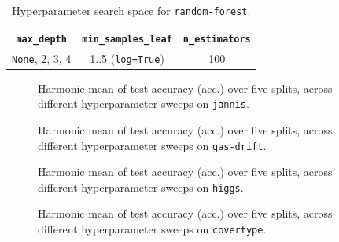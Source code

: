 \documentclass{article}
\begin{document}
\begin{table}[htbp]
  \centering
  \caption{Hyperparameter search space for \texttt{random-forest}.}
  \label{tab:hyperparams_spaces_random_forest}
  \small
  \begin{tabular}{ccc}
    \toprule
    \texttt{max\_depth} & \small\texttt{min\_samples\_leaf} & \texttt{n\_estimators} \\
    \midrule
    \texttt{None}, 2, 3, 4 & 1..5 (\texttt{log=True}) & 100 \\
    \bottomrule
  \end{tabular}
\end{table}

\begin{figure}[htbp]
  \centering
  
  
  
  \caption{
    Harmonic mean of test accuracy (acc.) over five splits, across different
    hyperparameter sweeps on \texttt{jannis}.
  }
  \label{fig:sweep_pareto_jannis}
\end{figure}

\begin{figure}[htbp]
  \centering
  
  
  
  \caption{
    Harmonic mean of test accuracy (acc.) over five splits, across different
    hyperparameter sweeps on \texttt{gas-drift}.
  }
  \label{fig:sweep_pareto_gas-drift-different-concentrations}
\end{figure}

\begin{figure}[htbp]
  \centering
  
  
  
  \caption{
    Harmonic mean of test accuracy (acc.) over five splits, across different
    hyperparameter sweeps on \texttt{higgs}.
  }
  \label{fig:sweep_pareto_higgs}
\end{figure}

\begin{figure}[htbp]
  \centering
  
  
  
  \caption{
    Harmonic mean of test accuracy (acc.) over five splits, across different
    hyperparameter sweeps on \texttt{covertype}.
  }
  \label{fig:sweep_pareto_covertype}
\end{figure}
\end{document}
